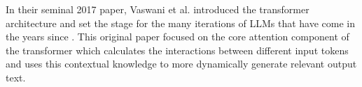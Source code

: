 In their seminal 2017 paper, Vaswani et al. introduced the 
transformer architecture and set the stage for the many iterations of LLMs that 
have come in the years since \cite{vaswani2023attentionneed}. This original paper focused on the core attention 
component of the transformer which calculates the interactions between different
input tokens and uses this contextual knowledge to more dynamically generate 
relevant output text.